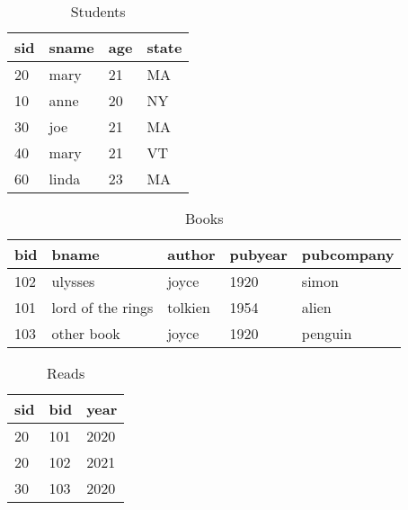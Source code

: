\documentclass[letterpaper, 11pt]{article}
\begin{document}
\begin{table}[H]
    \centering
    \caption*{Students}
    \begin{tabular}{|l|l|l|l|}
    \hline
        \cellcolor[HTML]{b4c6e7} sid & \cellcolor[HTML]{b4c6e7} sname & \cellcolor[HTML]{b4c6e7} age & \cellcolor[HTML]{b4c6e7} state \\
        \hline
        20 & mary & 21 & MA \\
        \hline
        10 & anne & 20 & NY \\
        \hline
        30 & joe & 21 & MA \\
        \hline
        40 & mary & 21 & VT \\
        \hline
        60 & linda & 23 & MA \\
        \hline
    \end{tabular}
\end{table}
\vspace{-2em}
\begin{minipage}[t]{0.7\textwidth}
\begin{table}[H]
    \centering
    \caption*{Books}
    \begin{tabular}{|l|l|l|l|l|}
    \hline
        \cellcolor[HTML]{b4c6e7} bid & \cellcolor[HTML]{b4c6e7} bname & \cellcolor[HTML]{b4c6e7} author & \cellcolor[HTML]{b4c6e7} pubyear & \cellcolor[HTML]{b4c6e7} pubcompany \\
        \hline
        102 & ulysses & joyce & 1920 & simon \\
        \hline
        101 & lord of the rings & tolkien & 1954 & alien \\
        \hline
        103 & other book & joyce & 1920 & penguin \\
        \hline
    \end{tabular}
\end{table}
\end{minipage}
\begin{minipage}[t]{0.2\textwidth}
\begin{table}[H]
    \centering
    \caption*{Reads}
    \begin{tabular}{|l|l|l|}
        \hline
        \cellcolor[HTML]{b4c6e7} sid & \cellcolor[HTML]{b4c6e7} bid & \cellcolor[HTML]{b4c6e7} year \\
        \hline
        20 & 101 & 2020 \\
        \hline
        20 & 102 & 2021 \\
        \hline
        30 & 103 & 2020 \\
        \hline
    \end{tabular}
\end{table}
\end{minipage}
\vspace{1em}
\end{document}
